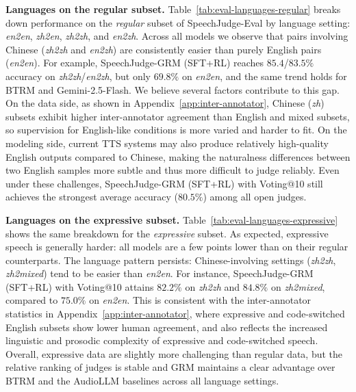 \documentclass[]{bytedance_seed}
\begin{document}
\textbf{Languages on the regular subset.}\quad
Table~\ref{tab:eval-languages-regular} breaks down performance on the
\textit{regular} subset of {SpeechJudge-Eval} by language setting:
\textit{en2en}, \textit{zh2en}, \textit{zh2zh}, and \textit{en2zh}.
Across all models we observe that pairs involving Chinese
(\textit{zh2zh} and \textit{en2zh}) are consistently easier than purely
English pairs (\textit{en2en}).
For example, SpeechJudge-GRM (SFT+RL) reaches $85.4$/$83.5\%$ accuracy on
\textit{zh2zh}/\textit{en2zh}, but only $69.8\%$ on \textit{en2en}, and the
same trend holds for BTRM and Gemini-2.5-Flash.
We believe several factors contribute to this gap.
On the data side, as shown in Appendix~\ref{app:inter-annotator}, Chinese
(\textit{zh}) subsets exhibit higher inter-annotator agreement than English
and mixed subsets, so supervision for English-like conditions is more varied and
harder to fit.
On the modeling side, current TTS systems may also produce relatively
high-quality English outputs compared to Chinese, making the naturalness differences between two
English samples more subtle and thus more difficult to judge reliably.
Even under these challenges, SpeechJudge-GRM (SFT+RL) with Voting@10 still
achieves the strongest average accuracy ($80.5\%$) among all open judges.

\textbf{Languages on the expressive subset.}\quad
Table~\ref{tab:eval-languages-expressive} shows the same breakdown for the
\textit{expressive} subset.
As expected, expressive speech is generally harder: all models are a few
points lower than on their regular counterparts.
The language pattern persists: Chinese-involving settings
(\textit{zh2zh}, \textit{zh2mixed}) tend to be easier than \textit{en2en}.
For instance, SpeechJudge-GRM (SFT+RL) with Voting@10 attains $82.2\%$ on
\textit{zh2zh} and $84.8\%$ on \textit{zh2mixed}, compared to $75.0\%$ on
\textit{en2en}.
This is consistent with the inter-annotator statistics in
Appendix~\ref{app:inter-annotator}, where expressive and code-switched
English subsets show lower human agreement, and also reflects the increased
linguistic and prosodic complexity of expressive and code-switched speech.
Overall, expressive data are slightly more challenging than regular data, but
the relative ranking of judges is stable and GRM maintains a clear advantage
over BTRM and the AudioLLM baselines across all language settings.
\end{document}
